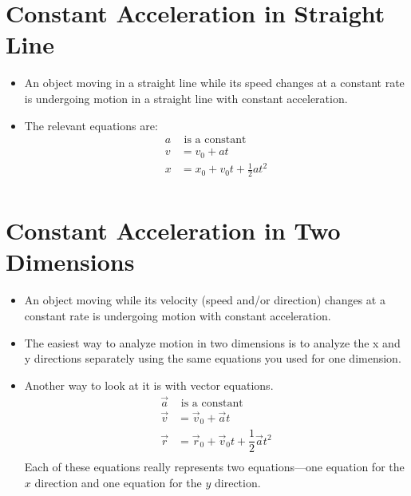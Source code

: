 \documentclass{article}
\begin{document}
\section{Constant Acceleration in Straight Line}
\begin{itemize}
  \item An object moving in a straight line while its speed changes at a constant rate is undergoing
    motion in a straight line with constant acceleration.
  \item The relevant equations are:
    \begin{align*}
      a & \text{ is a constant} \\
      v &= v_0 + at \\
      x &= x_0 + v_0t + \frac{1}{2} at^2 \\
    \end{align*}
\end{itemize}

\pagebreak

\section{Constant Acceleration in Two Dimensions}
\begin{itemize}
  \item An object moving while its velocity (speed and/or direction) changes at a constant rate is undergoing motion
    with constant acceleration.
  \item The easiest way to analyze motion in two dimensions is to analyze the x and y directions separately using the
    same equations you used for one dimension.
  \item Another way to look at it is with vector equations.
    \begin{align*}
      \vec{a} & \text{ is a constant} \\
      \vec{v} &= \vec{v}_0 + \vec{a}t \\
      \vec{r} &= \vec{r}_0 + \vec{v}_0 t + \dfrac{1}{2} \vec{a}t^2 \\
    \end{align*}
    Each of these equations really represents two equations---one equation for the $x$ direction and one equation for the
    $y$ direction.
\end{itemize}
\end{document}

